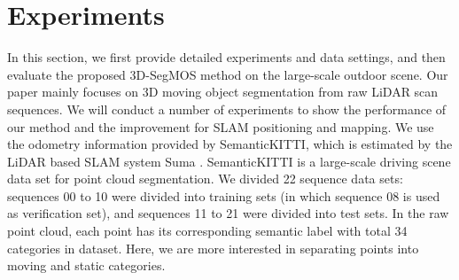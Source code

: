 \documentclass[lettersize,journal]{IEEEtran}
\begin{document}

\section{Experiments}
In this section, we first provide detailed experiments and data settings, and then evaluate the proposed 3D-SegMOS method on the large-scale outdoor scene. Our paper mainly focuses on 3D moving object segmentation from raw LiDAR scan sequences. We will conduct a  number of experiments to show the performance of our method and the improvement for SLAM positioning and mapping. We use the odometry information provided by SemanticKITTI, which is estimated by the LiDAR based SLAM system Suma \cite{chen2019suma++}. SemanticKITTI is a large-scale driving scene data set for point cloud segmentation. We divided 22 sequence data sets: sequences 00 to 10 were divided into training sets (in which sequence 08 is used as verification set), and sequences 11 to 21 were divided into test sets. In the raw point cloud, each point has its corresponding semantic label with total 34 categories in dataset. Here, we are more interested in separating points into moving and static categories.
\end{document}
